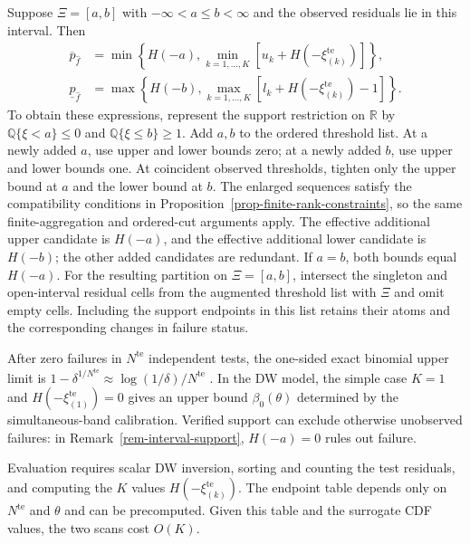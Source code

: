 \documentclass[review,11pt,3p,authoryear,nopreprintline]{elsarticle}
\begin{document}
\begin{remark}
  \label{rem-interval-support}
  Suppose $\Xi=[a,b]$ with $-\infty<a\le b<\infty$ and the observed residuals lie in this interval. Then
  \begin{align*}
    \overline p_{\hat f}
    &=\min\left\{H(-a),\min_{k=1,\ldots,K}[u_k+H\left(-\xi_{(k)}^{\mathrm{te}}\right)]\right\},\\
    \underline p_{\hat f}
    &=\max\left\{H(-b),\max_{k=1,\ldots,K}[l_k+H\left(-\xi_{(k)}^{\mathrm{te}}\right)-1]\right\}.
  \end{align*}
  To obtain these expressions, represent the support restriction on $\mathbb R$ by
  $\mathbb Q\{\xi<a\}\le0$ and $\mathbb Q\{\xi\le b\}\ge1$.
  Add $a,b$ to the ordered threshold list. At a newly added $a$, use upper and lower bounds zero; at a newly added $b$, use upper and lower bounds one. At coincident observed thresholds, tighten only the upper bound at $a$ and the lower bound at $b$. The enlarged sequences satisfy the compatibility conditions in Proposition~\ref{prop-finite-rank-constraints}, so the same finite-aggregation and ordered-cut arguments apply. The effective additional upper candidate is $H(-a)$, and the effective additional lower candidate is $H(-b)$; the other added candidates are redundant. If $a=b$, both bounds equal $H(-a)$. For the resulting partition on $\Xi=[a,b]$, intersect the singleton and open-interval residual cells from the augmented threshold list with $\Xi$ and omit empty cells. Including the support endpoints in this list retains their atoms and the corresponding changes in failure status.
\end{remark}

After zero failures in $N^{\mathrm{te}}$ independent tests, the one-sided exact binomial upper limit is $1-\delta^{1/N^{\mathrm{te}}}\approx\log(1/\delta)/N^{\mathrm{te}}$ \citep{C.P34}. In the DW model, the simple case $K=1$ and $H\left(-\xi_{(1)}^{\mathrm{te}}\right)=0$ gives an upper bound $\beta_0(\theta)$ determined by the simultaneous-band calibration. Verified support can exclude otherwise unobserved failures: in Remark~\ref{rem-interval-support}, $H(-a)=0$ rules out failure.

Evaluation requires scalar DW inversion, sorting and counting the test residuals, and computing the $K$ values $H\left(-\xi_{(k)}^{\mathrm{te}}\right)$. The endpoint table depends only on $N^{\mathrm{te}}$ and $\theta$ and can be precomputed. Given this table and the surrogate CDF values, the two scans cost $O(K)$.
\end{document}

